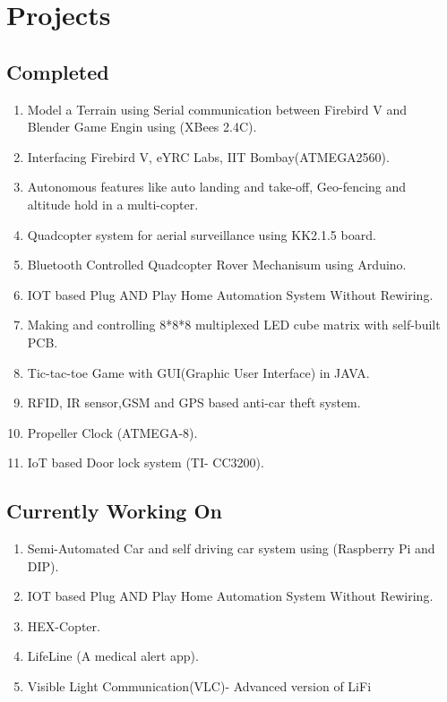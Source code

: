 \documentclass[11pt]{article}
\begin{document}
\begin{minipage}{1.0\linewidth}

\section{\color{orange}Pro\color{black}jects}
\subsection{Co\color{purple}m\color{black}pl\color{purple}e\color{black}ted}
\begin{enumerate}
\item Model a Terrain using Serial communication between Firebird V and\\ Blender Game Engin using (XBees 2.4C).
\item Interfacing Firebird V, eYRC Labs, IIT Bombay(ATMEGA2560).
\item Autonomous features like auto landing and take-off, Geo-fencing and\\ altitude hold in a multi-copter.
\item Quadcopter system for aerial surveillance using KK2.1.5 board.
\item Bluetooth Controlled Quadcopter Rover Mechanisum using Arduino.
\item IOT based Plug AND Play Home Automation System Without Rewiring. 
\item Making and controlling 8*8*8 multiplexed LED cube matrix with self-built PCB.
\item Tic-tac-toe Game with GUI(Graphic User Interface) in JAVA.
\item RFID, IR sensor,GSM and GPS based anti-car theft system.
\item Propeller Clock  (ATMEGA-8).
\item IoT based Door lock system (TI- CC3200).
\end{enumerate}
\subsection{Currently Working On}
\begin{enumerate}
\item Semi-Automated Car and self driving car system using (Raspberry Pi and\\ DIP). 
\item IOT based Plug AND Play Home Automation System Without Rewiring. 
\item HEX-Copter.
\item LifeLine (A medical alert app). 
\item Visible Light Communication(VLC)- Advanced version of LiFi
\end{enumerate}


\end{minipage}
\end{document}
